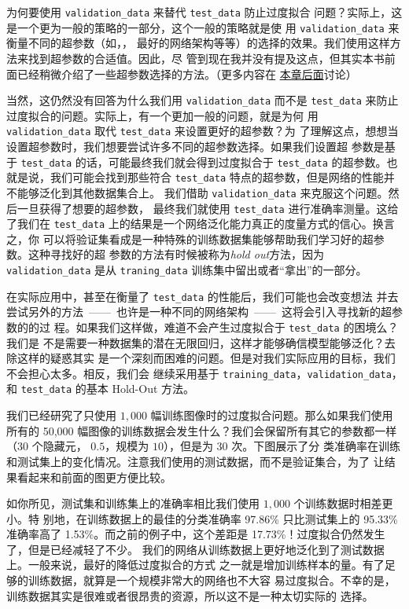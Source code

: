 \label{validation_explanation}
为何要使用 \lstinline!validation_data! 来替代 \lstinline!test_data! 防止过度拟合
问题？实际上，这是一个更为一般的策略的一部分，这个一般的策略就是使
用 \lstinline!validation_data! 来衡量不同的超参数（如\epochs{}，\learningrate{}，
最好的网络架构等等）的选择的效果。我们使用这样方法来找到超参数的合适值。因此，尽
管到现在我并没有提及这点，但其实本书前面已经稍微介绍了一些超参数选择的方法。（更多内容在%
\hyperref[sec:how_to_choose_a_neural_network's_hyper-parameters]{本章后面}讨论）

当然，这仍然没有回答为什么我们用 \lstinline!validation_data! 而不是
\lstinline!test_data! 来防止过度拟合的问题。实际上，有一个更加一般的问题，就是为何
用 \lstinline!validation_data! 取代 \lstinline!test_data! 来设置更好的超参数？为
了理解这点，想想当设置超参数时，我们想要尝试许多不同的超参数选择。如果我们设置超
参数是基于 \lstinline!test_data! 的话，可能最终我们就会得到过度拟合于
\lstinline!test_data!  的超参数。也就是说，我们可能会找到那些符合
\lstinline!test_data! 特点的超参数，但是网络的性能并不能够泛化到其他数据集合上。
我们借助 \lstinline!validation_data! 来克服这个问题。然后一旦获得了想要的超参数，
最终我们就使用 \lstinline!test_data! 进行准确率测量。这给了我们在
\lstinline!test_data! 上的结果是一个网络泛化能力真正的度量方式的信心。换言之，你
可以将验证集看成是一种特殊的训练数据集能够帮助我们学习好的超参数。这种寻找好的超
参数的方法有时候被称为\emph{hold out}方法，因为 \lstinline!validation_data! 是从
\lstinline!traning_data! 训练集中留出或者“拿出”的一部分。

在实际应用中，甚至在衡量了 \lstinline!test_data! 的性能后，我们可能也会改变想法
并去尝试另外的方法~——~也许是一种不同的网络架构~——~这将会引入寻找新的超参数的的过
程。如果我们这样做，难道不会产生过度拟合于 \lstinline!test_data! 的困境么？我们是
不是需要一种数据集的潜在无限回归，这样才能够确信模型能够泛化？去除这样的疑惑其实
是一个深刻而困难的问题。但是对我们实际应用的目标，我们不会担心太多。相反，我们会
继续采用基于 \lstinline!training_data!，\lstinline!validation_data!，和
\lstinline!test_data! 的基本 Hold-Out 方法。

我们已经研究了只使用 $1,000$ 幅训练图像时的过度拟合问题。那么如果我们使用所有的
50,000 幅图像的训练数据会发生什么？我们会保留所有其它的参数都一样（$30$ 个隐藏元，
  \learningrate{} $0.5$，\minibatch{}规模为 $10$），但是\epochs{}为 30 次。下图展示了分
类准确率在训练和测试集上的变化情况。注意我们使用的测试数据，而不是验证集合，为了
让结果看起来和前面的图更方便比较。

如你所见，测试集和训练集上的准确率相比我们使用 $1,000$ 个训练数据时相差更小。特
别地，在训练数据上的最佳的分类准确率 97.86\% 只比测试集上的 95.33\% 准确率高了
1.53\%。而之前的例子中，这个差距是 17.73\%！过度拟合仍然发生了，但是已经减轻了不少。
我们的网络从训练数据上更好地泛化到了测试数据上。一般来说，最好的降低过度拟合的方式
之一就是增加训练样本的量。有了足够的训练数据，就算是一个规模非常大的网络也不大容
易过度拟合。不幸的是，训练数据其实是很难或者很昂贵的资源，所以这不是一种太切实际的
选择。

